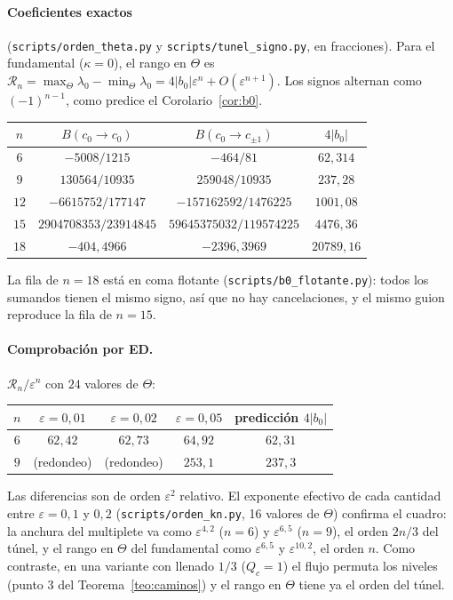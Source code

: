 \documentclass[11pt,a4paper]{article}
\theoremstyle{definition}
\theoremstyle{remark}
\newcommand{\eps}{\varepsilon}
\newcommand{\scr}[1]{\texttt{scripts/#1}}
\begin{document}
\paragraph{Coeficientes exactos} (\scr{orden\_theta.py} y \scr{tunel\_signo.py}, en fracciones). Para
el fundamental ($\kappa=0$), el rango en $\Theta$ es
$\mathcal R_n=\max_\Theta\lambda_0-\min_\Theta\lambda_0=4|b_0|\eps^n+O(\eps^{n+1})$. Los signos alternan como
$(-1)^{n-1}$, como predice el Corolario~\ref{cor:b0}.

\begin{center}
\begin{tabular}{cccc}
\toprule
$n$ & $B(c_0\to c_0)$ & $B(c_0\to c_{\pm1})$ & $4|b_0|$\\
\midrule
$6$ & $-5008/1215$ & $-464/81$ & $62{,}314$\\
$9$ & $130564/10935$ & $259048/10935$ & $237{,}28$\\
$12$ & $-6615752/177147$ & $-157162592/1476225$ & $1001{,}08$\\
$15$ & $2904708353/23914845$ & $59645375032/119574225$ & $4476{,}36$\\
$18$ & $-404{,}4966$ & $-2396{,}3969$ & $20789{,}16$\\
\bottomrule
\end{tabular}
\end{center}

\noindent
La fila de $n=18$ está en coma flotante (\scr{b0\_flotante.py}): todos los sumandos tienen el mismo signo, así
que no hay cancelaciones, y el mismo guion reproduce la fila de $n=15$.

\paragraph{Comprobación por ED.} $\mathcal R_n/\eps^n$ con $24$ valores de $\Theta$:

\begin{center}
\begin{tabular}{ccccc}
\toprule
$n$ & $\eps=0{,}01$ & $\eps=0{,}02$ & $\eps=0{,}05$ & predicción $4|b_0|$\\
\midrule
$6$ & $62{,}42$ & $62{,}73$ & $64{,}92$ & $62{,}31$\\
$9$ & (redondeo) & (redondeo) & $253{,}1$ & $237{,}3$\\
\bottomrule
\end{tabular}
\end{center}

\noindent
Las diferencias son de orden $\eps^2$ relativo. El exponente efectivo de cada cantidad entre
$\eps=0{,}1$ y $0{,}2$ (\scr{orden\_kn.py}, 16 valores de $\Theta$) confirma el cuadro: la anchura del
multiplete va como $\eps^{4{,}2}$ ($n=6$) y $\eps^{6{,}5}$ ($n=9$), el orden $2n/3$ del túnel, y el rango
en $\Theta$ del fundamental como $\eps^{6{,}5}$ y $\eps^{10{,}2}$, el orden $n$. Como contraste, en una
variante con llenado $1/3$ ($Q_c=1$) el flujo permuta los niveles (punto 3 del
Teorema~\ref{teo:caminos}) y el rango en $\Theta$ tiene ya el orden del túnel.
\end{document}
